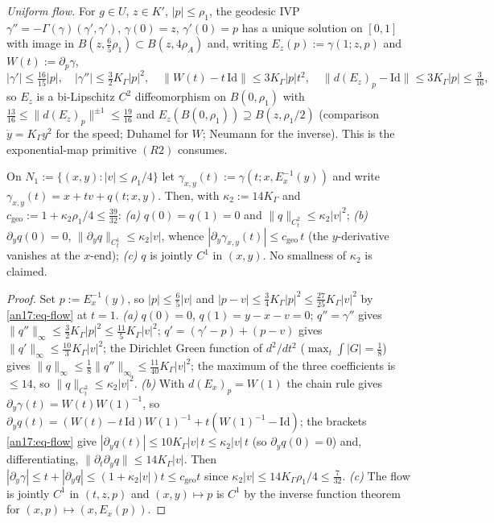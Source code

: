 \emph{Uniform flow.} For $g\in U$, $z\in K'$, $|p|\le\rho_1$, the geodesic IVP
$\gamma''=-\Gamma(\gamma)(\gamma',\gamma')$, $\gamma(0)=z$, $\gamma'(0)=p$ has a
unique solution on $[0,1]$ with image in $B(z,\tfrac65\rho_1)\subset B(z,4\rho_A)$
and, writing $E_z(p):=\gamma(1;z,p)$ and $W(t):=\partial_p\gamma$,
\begin{equation}\label{an17:eq-flow}
 |\gamma'|\le\tfrac{16}{15}|p|,\quad
 |\gamma''|\le\tfrac32K_\Gamma|p|^2,\quad
 \|W(t)-t\,\mathrm{Id}\|\le3K_\Gamma|p|t^2,\quad
 \|d(E_z)_p-\mathrm{Id}\|\le3K_\Gamma|p|\le\tfrac3{16},
\end{equation}
so $E_z$ is a bi-Lipschitz $C^2$ diffeomorphism on $B(0,\rho_1)$ with
$\tfrac{13}{16}\le\|d(E_z)_p\|^{\pm1}\le\tfrac{19}{16}$ and $E_z(B(0,\rho_1))
\supseteq B(z,\rho_1/2)$ (comparison $\dot y=K_\Gamma y^2$ for the speed; Duhamel
for $W$; Neumann for the inverse). This is the exponential-map primitive $(R2)$
consumes.

\begin{proposition}\label{an17:prop-R1}\label{an17:R1}%
On $N_1:=\{(x,y):|v|\le\rho_1/4\}$ let $\gamma_{x,y}(t):=\gamma(t;x,E_x^{-1}(y))$
and write $\gamma_{x,y}(t)=x+tv+q(t;x,y)$. Then, with $\kappa_2:=14K_\Gamma$ and
$c_{\mathrm{geo}}:=1+\kappa_2\rho_1/4\le\tfrac{39}{32}$:
\emph{(a)} $q(0)=q(1)=0$ and $\|q\|_{C^2_t}\le\kappa_2|v|^2$;
\emph{(b)} $\partial_yq(0)=0$, $\|\partial_yq\|_{C^1_t}\le\kappa_2|v|$, whence
$|\partial_y\gamma_{x,y}(t)|\le c_{\mathrm{geo}}\,t$ (the $y$-derivative vanishes
at the $x$-end); \emph{(c)} $q$ is jointly $C^1$ in $(x,y)$. No smallness of
$\kappa_2$ is claimed.
\end{proposition}
\begin{proof}
Set $p:=E_x^{-1}(y)$, so $|p|\le\tfrac65|v|$ and $|p-v|\le\tfrac34K_\Gamma|p|^2
\le\tfrac{27}{25}K_\Gamma|v|^2$ by \eqref{an17:eq-flow} at $t=1$.
\emph{(a)} $q(0)=0$, $q(1)=y-x-v=0$; $q''=\gamma''$ gives $\|q''\|_\infty\le
\tfrac32K_\Gamma|p|^2\le\tfrac{11}5K_\Gamma|v|^2$; $q'=(\gamma'-p)+(p-v)$ gives
$\|q'\|_\infty\le\tfrac{10}3K_\Gamma|v|^2$; the Dirichlet Green function of
$d^2/dt^2$ ($\max_t\int|G|=\tfrac18$) gives $\|q\|_\infty\le\tfrac18\|q''\|_\infty
\le\tfrac{11}{40}K_\Gamma|v|^2$; the maximum of the three coefficients is
$\le14$, so $\|q\|_{C^2_t}\le\kappa_2|v|^2$.
\emph{(b)} With $d(E_x)_p=W(1)$ the chain rule gives $\partial_y\gamma(t)=
W(t)W(1)^{-1}$, so $\partial_yq(t)=(W(t)-t\,\mathrm{Id})W(1)^{-1}+t(W(1)^{-1}-
\mathrm{Id})$; the brackets \eqref{an17:eq-flow} give $|\partial_yq(t)|\le
10K_\Gamma|v|\,t\le\kappa_2|v|\,t$ (so $\partial_yq(0)=0$) and, differentiating,
$\|\partial_t\partial_yq\|\le14K_\Gamma|v|$. Then $|\partial_y\gamma|\le t+
|\partial_yq|\le(1+\kappa_2|v|)t\le c_{\mathrm{geo}}t$ since $\kappa_2|v|\le
14K_\Gamma\rho_1/4\le\tfrac7{32}$.
\emph{(c)} The flow is jointly $C^1$ in $(t,z,p)$ and $(x,y)\mapsto p$ is $C^1$
by the inverse function theorem for $(x,p)\mapsto(x,E_x(p))$.
\end{proof}

